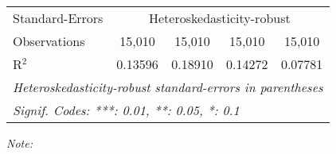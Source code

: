 \begin{table}[htbp!]
\begin{adjustbox}{width = 1\textwidth, max height = 0.95\textheight, center}
\begin{threeparttable}[b]
\begin{tabular}{lcccc}
            \midrule 
            Standard-Errors & \multicolumn{4}{c}{Heteroskedasticity-robust} \\ 
            Observations         & 15,010                         & 15,010                         & 15,010                          & 15,010\\  
            R$^2$                & 0.13596                        & 0.18910                        & 0.14272                         & 0.07781\\  
            \midrule \midrule
            \multicolumn{5}{l}{\emph{Heteroskedasticity-robust standard-errors in parentheses}}\\
            \multicolumn{5}{l}{\emph{Signif. Codes: ***: 0.01, **: 0.05, *: 0.1}}\\
         \end{tabular}
         
         \begin{tablenotes}\item \medskip \textit{Note:}
         \end{tablenotes}
      \end{threeparttable}
   \end{adjustbox}
\end{table}


